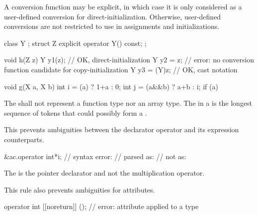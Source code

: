 \pnum
A conversion function may be explicit, in which case it is only considered as a user-defined conversion for direct-initialization. Otherwise, user-defined conversions are not restricted to use in assignments and initializations.
\begin{example}
\begin{codeblock}
class Y { };
struct Z {
  explicit operator Y() const;
};

void h(Z z) {
  Y y1(z);          // OK, direct-initialization
  Y y2 = z;         // error: no conversion function candidate for copy-initialization
  Y y3 = (Y)z;      // OK, cast notation
}

void g(X a, X b) {
  int i = (a) ? 1+a : 0;
  int j = (a&&b) ? a+b : i;
  if (a) {
  }
}
\end{codeblock}
\end{example}

\pnum
The
shall not represent a function type nor an array type.
The
in a
is the longest sequence of
tokens that could possibly form a .
\begin{note}
This prevents ambiguities between the declarator operator \tcode{*} and its expression
counterparts.
\begin{example}
\begin{codeblock}
&ac.operator int*i; // syntax error:
                    // parsed as: 
                    // not as: 
\end{codeblock}
The \tcode{*} is the pointer declarator and not the multiplication operator.
\end{example}
This rule also prevents ambiguities for attributes.
\begin{example}
\begin{codeblock}
operator int [[noreturn]] ();   // error:  attribute applied to a type
\end{codeblock}
\end{example}
\end{note}

